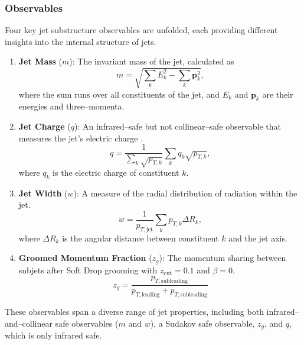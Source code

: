             \subsubsection{Observables}
                Four key jet substructure observables are unfolded, each providing different insights into the internal structure of jets.
                \begin{enumerate}
                \item \textbf{Jet Mass} ($m$): The invariant mass of the jet, calculated as
                \[
                    m = \sqrt{\sum_k E_k^2 - \sum_k \mathbf{p}_k^2},
                \]
                where the sum runs over all constituents of the jet, and $E_k$ and $\mathbf{p}_k$ are their energies and three--momenta.
            \item \textbf{Jet Charge} ($q$): An infrared--safe but not collinear--safe observable that measures the jet's electric charge .
            \[
                q = \frac{1}{\sum_k \sqrt{p_{T,k}}}\sum_k q_k \sqrt{p_{T,k}},
            \]
            where $q_k$ is the electric charge of constituent $k$.
            \item \textbf{Jet Width} ($w$): A measure of the radial distribution of radiation within the jet.
            \[
                w = \frac{1}{p_{T,\text{jet}}}\sum_k p_{T,k} \Delta R_k,
            \]
            where $\Delta R_k$ is the angular distance between constituent $k$ and the jet axis.
            \item \textbf{Groomed Momentum Fraction} ($z_g$): The momentum sharing between subjets after Soft Drop grooming  with $z_{\text{cut}} = 0.1$ and $\beta = 0$.
            \[
                z_g = \frac{p_{T,\text{subleading}}}{p_{T,\text{leading}} + p_{T,\text{subleading}}}
            \]
            \end{enumerate}
            These observables span a diverse range of jet properties, including both infrared--and--collinear safe observables ($m$ and $w$), a Sudakov safe observable, \(z_g\), and \(q\), which is only infrared safe.
